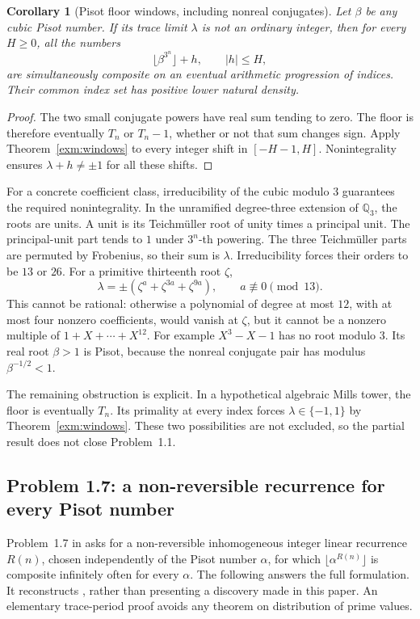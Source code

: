 \documentclass[11pt,a4paper]{article}
\numberwithin{equation}{section}
\newtheorem{corollary}[theorem]{Corollary}
\theoremstyle{definition}
\theoremstyle{remark}
\begin{document}
\begin{corollary}[Pisot floor windows, including nonreal conjugates]
\label{exm:floor-windows}
Let \(\beta\) be any cubic Pisot number. If its trace limit
\(\lambda\) is not an ordinary integer, then for every
\(H\ge0\), all the numbers
\[
 \lfloor\beta^{3^n}\rfloor+h,\qquad |h|\le H,
\]
are simultaneously composite on an eventual arithmetic
progression of indices. Their common index set has positive
lower natural density.
\end{corollary}
\begin{proof}
The two small conjugate powers have real sum tending to zero.
The floor is therefore eventually \(T_n\) or \(T_n-1\),
whether or not that sum changes sign. Apply
Theorem~\ref{exm:windows} to every integer shift in
\([-H-1,H]\). Nonintegrality ensures
\(\lambda+h\ne\pm1\) for all these shifts.
\end{proof}

For a concrete coefficient class, irreducibility of the cubic
modulo \(3\) guarantees the required nonintegrality.
In the unramified degree-three extension of \(\mathbb Q_3\),
the roots are units. A unit is its Teichm\"uller root of unity
times a principal unit. The principal-unit part tends to \(1\)
under \(3^n\)-th powering. The three Teichm\"uller parts are
permuted by Frobenius, so their sum is \(\lambda\).
Irreducibility forces their orders to be \(13\) or \(26\).
For a primitive thirteenth root \(\zeta\),
\[
 \lambda=\pm(\zeta^a+\zeta^{3a}+\zeta^{9a}),
 \qquad a\not\equiv0\pmod{13}.
\]
This cannot be rational: otherwise a polynomial of degree
at most \(12\), with at most four nonzero coefficients,
would vanish at \(\zeta\), but it cannot be a nonzero
multiple of \(1+X+\cdots+X^{12}\).
For example \(X^3-X-1\) has no root modulo \(3\).
Its real root \(\beta>1\) is Pisot, because the nonreal
conjugate pair has modulus \(\beta^{-1/2}<1\).

The remaining obstruction is explicit. In a hypothetical algebraic
Mills tower, the floor is eventually \(T_n\). Its primality
at every index forces \(\lambda\in\{-1,1\}\) by
Theorem~\ref{exm:windows}. These two possibilities are not
excluded, so the partial result does not close Problem~1.1.

\subsection{Problem 1.7: a non-reversible recurrence for every Pisot number}
\label{exm:nonreversible}

Problem~1.7 in \cite{SaitoIntervals} asks for a non-reversible
inhomogeneous integer linear recurrence \(R(n)\), chosen
independently of the Pisot number \(\alpha\), for which
\(\lfloor\alpha^{R(n)}\rfloor\) is composite infinitely often
for every \(\alpha\). The following answers the full formulation.
It reconstructs \cite{VMRC008}, rather than presenting a
discovery made in this paper. An elementary trace-period proof
avoids any theorem on distribution of prime values.
\end{document}
